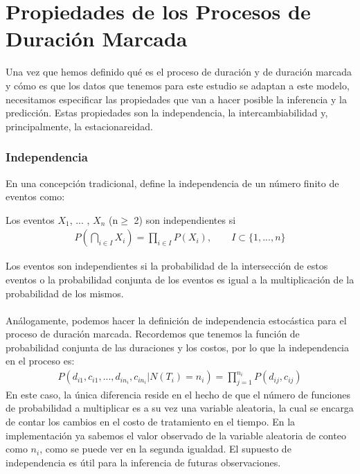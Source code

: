 \section{Propiedades de los Procesos de Duraci\'on Marcada}
Una vez que hemos definido qu\'e es el proceso de duraci\'on y de duraci\'on marcada y c\'omo es que los datos que tenemos para este estudio se adaptan a este modelo, necesitamos especificar las propiedades que van a hacer posible la inferencia y la predicci\'on. Estas propiedades son la independencia, la intercambiabilidad y, principalmente, la estacionareidad.
\subsubsection{Independencia}
En una concepci\'on tradicional, \cite{resnickpath} define la independencia de un n\'umero finito de eventos como:\\
\begin{defi}
Los eventos $X_1$, ... , $X_n$ (n$\geq$ 2) son independientes si
\begin{align*}
P\left(\bigcap_{i \in I} X_i\right) = \prod_{i \in I} P(X_i), \qquad I \subset\{1,...,n\}
\end{align*}
\end{defi}
Los eventos son independientes si la probabilidad de la intersecci\'on de estos eventos o la probabilidad conjunta de los eventos es igual a la multiplicaci\'on de la probabilidad de los mismos.\\
\\
An\'alogamente, podemos hacer la definici\'on de independencia estoc\'astica para el proceso de duraci\'on marcada. Recordemos que tenemos la funci\'on de probabilidad conjunta de las duraciones y los costos, por lo que la independencia en el proceso es:
\begin{eqnarray*}
P(d_{i1},c_{i1},...,d_{in_i},c_{in_i}|N(T_i)=n_i)= \prod_{j=1}^{n_i} P(d_{ij},c_{ij})
\end{eqnarray*}
En este caso, la \'unica diferencia reside en el hecho de que el n\'umero de funciones de probabilidad a multiplicar es a su vez una variable aleatoria, la cual se encarga de contar los cambios en el costo de tratamiento en el tiempo. En la implementaci\'on ya sabemos el valor observado de la variable aleatoria de conteo como $n_i$, como se puede ver en la segunda igualdad. El supuesto de independencia es \'util para la inferencia de futuras observaciones.
